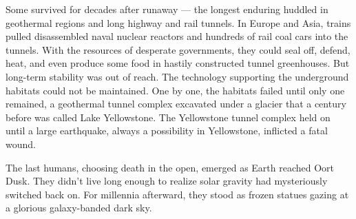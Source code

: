 Some survived for decades after runaway --- the longest enduring huddled
in geothermal regions and long highway and rail tunnels. In Europe and
Asia, trains pulled disassembled naval nuclear reactors and hundreds of
rail coal cars into the tunnels. With the resources of desperate
governments, they could seal off, defend, heat, and even produce some
food in hastily constructed tunnel greenhouses. But long-term stability
was out of reach. The technology supporting the underground habitats
could not be maintained. One by one, the habitats failed until only one
remained, a geothermal tunnel complex excavated under a glacier that a
century before was called Lake Yellowstone. The Yellowstone tunnel
complex held on until a large earthquake, always a possibility in
Yellowstone, inflicted a fatal wound.

The last humans, choosing death in the open, emerged as Earth reached
Oort Dusk. They didn't live long enough to realize solar gravity had
mysteriously switched back on. For millennia afterward, they stood as
frozen statues gazing at a glorious galaxy-banded dark sky.



%
 

